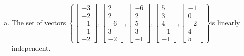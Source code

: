 \begin{exerciseAnswer}
\begin{enumerate}[(a)]
\item  The set of vectors \( \left\{ \left[\begin{array}{c}
-3 \\
-2 \\
-1 \\
-1 \\
-2
\end{array}\right] , \left[\begin{array}{c}
2 \\
2 \\
-6 \\
3 \\
-2
\end{array}\right] , \left[\begin{array}{c}
-6 \\
2 \\
5 \\
3 \\
-1
\end{array}\right] , \left[\begin{array}{c}
5 \\
3 \\
4 \\
-1 \\
-1
\end{array}\right] , \left[\begin{array}{c}
-1 \\
0 \\
-2 \\
4 \\
5
\end{array}\right] \right\} \)is linearly independent.
\end{enumerate}
    
\end{exerciseAnswer}
    
